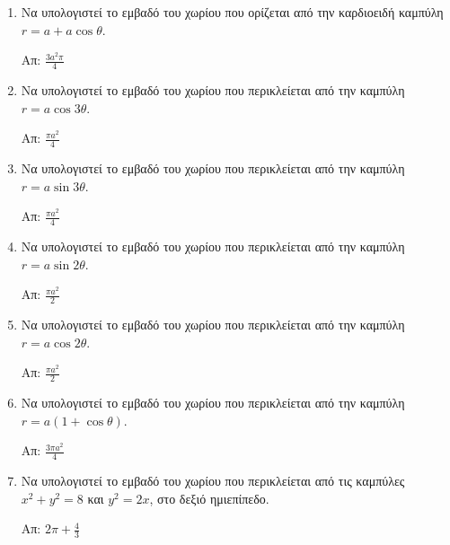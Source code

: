 


\everymath{\displaystyle}
\thispagestyle{empty}



\begin{center}
\end{center}

\vspace{\baselineskip}



\begin{enumerate}


	\item Να υπολογιστεί το εμβαδό του χωρίου που ορίζεται από την καρδιοειδή καμπύλη
		$ r = a + a\cos{\theta} $.

		\hfill Απ: $ \frac{3a^{2}\pi}{4} $

	\item Να υπολογιστεί το εμβαδό του χωρίου που περικλείεται από την καμπύλη $
		r = a \cos{3\theta} $.

		\hfill Απ: $ \frac{\pi a^{2}}{4} $

	\item Να υπολογιστεί το εμβαδό του χωρίου που περικλείεται από την καμπύλη $
		r = a \sin{3\theta} $.

		\hfill Απ: $ \frac{\pi a^{2}}{4} $

	\item Να υπολογιστεί το εμβαδό του χωρίου που περικλείεται από την καμπύλη $
		r = a \sin{2\theta} $.

		\hfill Απ: $ \frac{\pi a^{2}}{2} $

	\item Να υπολογιστεί το εμβαδό του χωρίου που περικλείεται από την καμπύλη $
		r = a \cos{2\theta} $.

		\hfill Απ: $ \frac{\pi a^{2}}{2} $

	\item Να υπολογιστεί το εμβαδό του χωρίου που περικλείεται από την καμπύλη $
		r = a (1+\cos{\theta}) $.

		\hfill Απ: $ \frac{3\pi a^{2}}{4} $

	\item Να υπολογιστεί το εμβαδό του χωρίου που περικλείεται από τις καμπύλες $
		x^{2} + y^{2} = 8 $ και $ y^{2} = 2x $, στο δεξιό ημιεπίπεδο.

		\hfill Απ: $ 2 \pi + \frac{4}{3} $



\end{enumerate}





